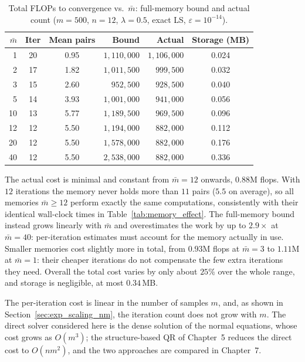 \begin{table}[H]
\centering
\caption{Total FLOPs to convergence vs.\ $\bar{m}$: full-memory bound and
  actual count ($m = 500$, $n = 12$, $\lambda = 0.5$, exact LS,
  $\varepsilon = 10^{-14}$).}
\label{tab:total_flops}
\small
\setlength{\tabcolsep}{8pt}
\begin{tabular}{rccrrc}
    \toprule
    $\bar{m}$ & \textbf{Iter} & \textbf{Mean pairs}
      & \textbf{Bound} & \textbf{Actual} & \textbf{Storage (MB)} \\
    \midrule
    1   & 20 & 0.95 & $1{,}110{,}000$ & $1{,}106{,}000$ & 0.024 \\
    2   & 17 & 1.82 & $1{,}011{,}500$ & $999{,}500$     & 0.032 \\
    3   & 15 & 2.60 & $952{,}500$     & $928{,}500$     & 0.040 \\
    5   & 14 & 3.93 & $1{,}001{,}000$ & $941{,}000$     & 0.056 \\
    10  & 13 & 5.77 & $1{,}189{,}500$ & $969{,}500$     & 0.096 \\
    12  & 12 & 5.50 & $1{,}194{,}000$ & $882{,}000$     & 0.112 \\
    20  & 12 & 5.50 & $1{,}578{,}000$ & $882{,}000$     & 0.176 \\
    40  & 12 & 5.50 & $2{,}538{,}000$ & $882{,}000$     & 0.336 \\
    \bottomrule
\end{tabular}
\end{table}

\noindent The actual cost is minimal and constant from $\bar m = 12$ onwards,
$0.88$M flops. With $12$ iterations the memory never holds more than $11$
pairs ($5.5$ on average), so all memories $\bar m \geq 12$ perform exactly the
same computations, consistently with their identical wall-clock times in
Table~\ref{tab:memory_effect}. The full-memory bound instead grows linearly
with $\bar m$ and overestimates the work by up to $2.9\times$ at
$\bar m = 40$: per-iteration estimates must account for the memory actually
in use. Smaller memories cost slightly more in total, from $0.93$M flops at
$\bar m = 3$ to $1.11$M at $\bar m = 1$: their cheaper iterations do not
compensate the few extra iterations they need. Overall the total cost varies
by only about $25\%$ over the whole range, and storage is negligible, at most
$0.34$\,MB.

\noindent The per-iteration cost is linear in the number of samples $m$, and, as
shown in Section~\ref{sec:exp_scaling_nm}, the iteration count does not grow
with $m$. The direct solver considered here is the dense solution of the
normal equations, whose cost grows as $O(m^3)$; the structure-based QR of
Chapter~5 reduces the direct cost to $O(nm^2)$, and the two approaches are
compared in Chapter~7.


